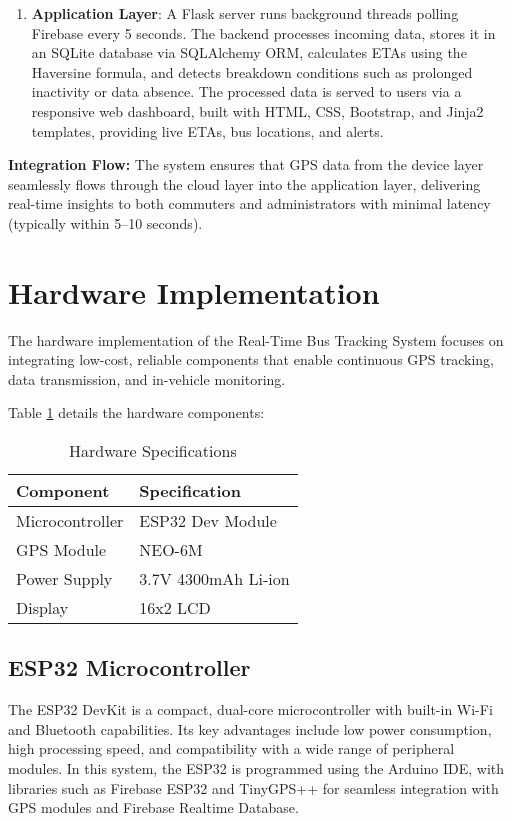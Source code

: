 \documentclass{article}
\begin{document}
\begin{multicols}{2}
\begin{enumerate}
\item \textbf{Application Layer}: A Flask server runs background threads polling Firebase every 5 seconds. The backend processes incoming data, stores it in an SQLite database via SQLAlchemy ORM, calculates ETAs using the Haversine formula, and detects breakdown conditions such as prolonged inactivity or data absence. The processed data is served to users via a responsive web dashboard, built with HTML, CSS, Bootstrap, and Jinja2 templates, providing live ETAs, bus locations, and alerts.
\end{enumerate}

\textbf{Integration Flow:} The system ensures that GPS data from the device layer seamlessly flows through the cloud layer into the application layer, delivering real-time insights to both commuters and administrators with minimal latency (typically within 5–10 seconds).


\section{Hardware Implementation}
\vspace{0.5em}
The hardware implementation of the Real-Time Bus Tracking System focuses on integrating low-cost, reliable components that enable continuous GPS tracking, data transmission, and in-vehicle monitoring.

Table \ref{tab:hardware} details the hardware components:

\begin{table}[H]
\centering
\caption{Hardware Specifications}
\label{tab:hardware}
\begin{tabular}{p{3cm}p{4cm}}
\toprule
\textbf{Component} & \textbf{Specification} \\
\midrule
Microcontroller & ESP32 Dev Module \\
GPS Module & NEO-6M \\
Power Supply & 3.7V 4300mAh Li-ion \\
Display & 16x2 LCD \\
\bottomrule
\end{tabular}
\end{table}

\subsection{ESP32 Microcontroller}
The ESP32 DevKit is a compact, dual-core microcontroller with built-in Wi-Fi and Bluetooth capabilities. Its key advantages include low power consumption, high processing speed, and compatibility with a wide range of peripheral modules. In this system, the ESP32 is programmed using the Arduino IDE, with libraries such as Firebase ESP32 and TinyGPS++ for seamless integration with GPS modules and Firebase Realtime Database.


\end{multicols}
\end{document}
